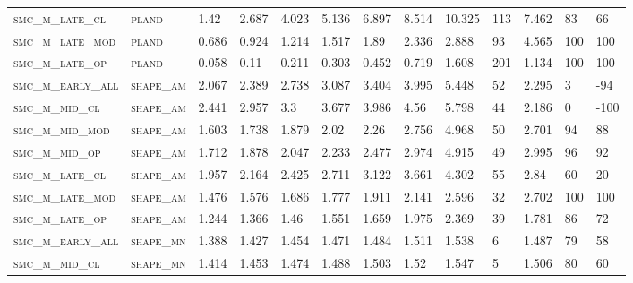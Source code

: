 \begin{landscape}
\begin{center}
\begin{footnotesize}
\begin{longtable}{lllllllllllll}
\textsc{smc\_m\_late\_cl  } & \textsc{pland     }   & 1.42     & 2.687    & 4.023    & 5.136    & 6.897    & 8.514    & 10.325   & 113    & 7.462         & 83            & 66       \\
\textsc{smc\_m\_late\_mod } & \textsc{pland     }   & 0.686    & 0.924    & 1.214    & 1.517    & 1.89     & 2.336    & 2.888    & 93     & 4.565         & 100           & 100      \\
\textsc{smc\_m\_late\_op  } & \textsc{pland     }   & 0.058    & 0.11     & 0.211    & 0.303    & 0.452    & 0.719    & 1.608    & 201    & 1.134         & 100           & 100      \\
\textsc{smc\_m\_early\_all} & \textsc{shape\_am }   & 2.067    & 2.389    & 2.738    & 3.087    & 3.404    & 3.995    & 5.448    & 52     & 2.295         & 3             & -94      \\
\textsc{smc\_m\_mid\_cl   } & \textsc{shape\_am }   & 2.441    & 2.957    & 3.3      & 3.677    & 3.986    & 4.56     & 5.798    & 44     & 2.186         & 0             & -100     \\
\textsc{smc\_m\_mid\_mod  } & \textsc{shape\_am }   & 1.603    & 1.738    & 1.879    & 2.02     & 2.26     & 2.756    & 4.968    & 50     & 2.701         & 94            & 88       \\
\textsc{smc\_m\_mid\_op   } & \textsc{shape\_am }   & 1.712    & 1.878    & 2.047    & 2.233    & 2.477    & 2.974    & 4.915    & 49     & 2.995         & 96            & 92       \\
\textsc{smc\_m\_late\_cl  } & \textsc{shape\_am }   & 1.957    & 2.164    & 2.425    & 2.711    & 3.122    & 3.661    & 4.302    & 55     & 2.84          & 60            & 20       \\
\textsc{smc\_m\_late\_mod } & \textsc{shape\_am }   & 1.476    & 1.576    & 1.686    & 1.777    & 1.911    & 2.141    & 2.596    & 32     & 2.702         & 100           & 100      \\
\textsc{smc\_m\_late\_op  } & \textsc{shape\_am }   & 1.244    & 1.366    & 1.46     & 1.551    & 1.659    & 1.975    & 2.369    & 39     & 1.781         & 86            & 72       \\
\textsc{smc\_m\_early\_all} & \textsc{shape\_mn }   & 1.388    & 1.427    & 1.454    & 1.471    & 1.484    & 1.511    & 1.538    & 6      & 1.487         & 79            & 58       \\
\textsc{smc\_m\_mid\_cl   } & \textsc{shape\_mn }   & 1.414    & 1.453    & 1.474    & 1.488    & 1.503    & 1.52     & 1.547    & 5      & 1.506         & 80            & 60       \\

\end{longtable}
\end{footnotesize}
\end{center}
\end{landscape}
